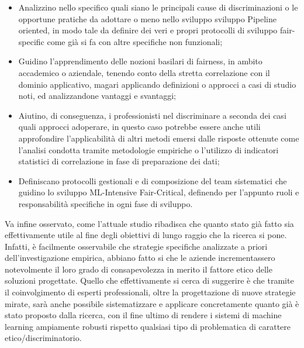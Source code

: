     \begin{itemize}
        \item Analizzino nello specifico quali siano le principali cause di discriminazioni o le opportune pratiche da adottare o meno nello sviluppo sviluppo Pipeline oriented, in modo tale da definire dei veri e propri protocolli di sviluppo fair-specific come già si fa con altre specifiche non funzionali;
        \item Guidino l'apprendimento delle nozioni basilari di fairness, in ambito accademico o aziendale, tenendo conto della stretta correlazione con il dominio applicativo, magari applicando definizioni o approcci a casi di studio noti, ed analizzandone vantaggi e svantaggi;
        \item Aiutino, di conseguenza, i professionisti nel discriminare a seconda dei casi quali approcci adoperare, in questo caso potrebbe essere anche utili approfondire l'applicabilità di altri metodi emersi dalle risposte ottenute come l'analisi condotta tramite metodologie empiriche o l'utilizzo di indicatori statistici di correlazione in fase di preparazione dei dati;
        \item Definiscano protocolli gestionali e di composizione del team sistematici che guidino lo sviluppo ML-Intensive Fair-Critical, definendo per l'appunto ruoli e responsabilità specifiche in ogni fase di sviluppo.
    \end{itemize}
    
    Va infine osservato, come l'attuale studio ribadisca che quanto stato già fatto sia effettivamente utile al fine degli obiettivi di lungo raggio che la ricerca si pone. Infatti, è facilmente osservabile che strategie specifiche analizzate a priori dell'investigazione empirica, abbiano fatto si che le aziende incrementassero notevolmente il loro grado di consapevolezza in merito il fattore etico delle soluzioni progettate. Quello che effettivamente si cerca di suggerire è che tramite il coinvolgimento di esperti professionali, oltre la progettazione di nuove strategie mirate, sarà anche possibile sistematizzare e applicare concretamente quanto già è stato proposto dalla ricerca, con il fine ultimo di rendere i sistemi di machine learning ampiamente robusti rispetto qualsiasi tipo di problematica di carattere etico/discriminatorio.
\newpage

